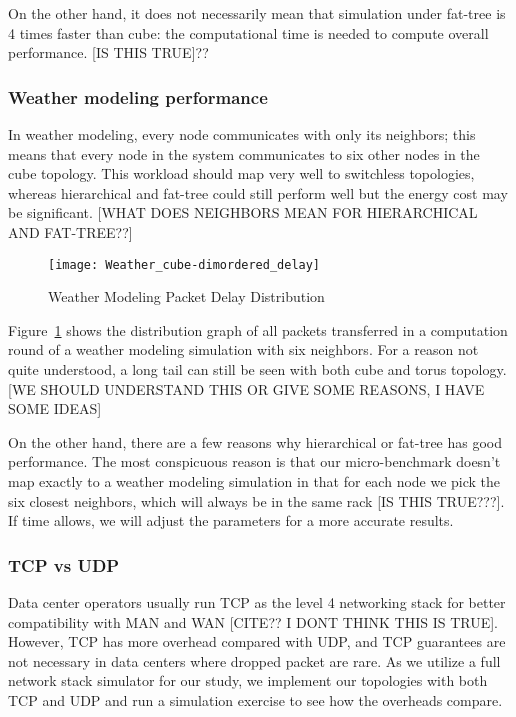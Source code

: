 On the other hand, it does not necessarily mean that simulation under fat-tree is 4 times faster than cube: the computational time is needed to compute overall performance. [IS THIS TRUE]??

\subsubsection{Weather modeling performance}
In weather modeling, every node communicates with only its neighbors; this means that every node in the system communicates to six other nodes in the cube topology. This workload should map very well to switchless topologies, whereas hierarchical and fat-tree could still perform well but the energy cost may be significant. [WHAT DOES NEIGHBORS MEAN FOR HIERARCHICAL AND FAT-TREE??]

\captionsetup[subfloat]{captionskip=-0.003in}
\begin{figure}
    \centering
    \texttt{[image: Weather\_cube-dimordered\_delay]}    
    \caption{Weather Modeling Packet Delay Distribution}
    \label{fig:weather_packetdelay}
\end{figure}

Figure~\ref{fig:weather_packetdelay} shows the distribution graph of all packets transferred in a computation round of a weather modeling simulation with six neighbors. For a reason not quite understood, a long tail can still be seen with both cube and torus topology. [WE SHOULD UNDERSTAND THIS OR GIVE SOME REASONS, I HAVE SOME IDEAS]

On the other hand, there are a few reasons why hierarchical or fat-tree has good performance. The most conspicuous reason is that our micro-benchmark doesn't map exactly to a weather modeling simulation in that for each node we pick the six closest neighbors, which will always be in the same rack [IS THIS TRUE???]. If time allows, we will adjust the parameters for a more accurate results.

\subsubsection{TCP vs UDP}
Data center operators usually run TCP as the level 4 networking stack for better compatibility with MAN and WAN [CITE?? I DONT THINK THIS IS TRUE]. However, TCP has more overhead compared with UDP, and TCP guarantees are not necessary in data centers where dropped packet are rare. As we utilize a full network stack simulator for our study, we implement our topologies with both TCP and UDP and run a simulation exercise to see how the overheads compare.

